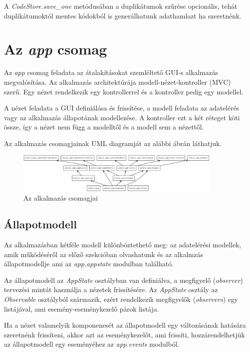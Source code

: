 A \emph{CodeStore.save\_one} metódusában a duplikátumok szűrése opcionális,
tehát duplikátumoktól mentes kódokból is generálhatunk adathamlazt ha szeretnénk.

\section{Az \emph{app} csomag}

Az \emph{app} csomag feladata az átalakításokat szemléltető GUI-s alkalmazás megvalósítása.
Az alkalmazás architektúrája modell-nézet-kontroller (MVC) szerű.
Egy nézet rendelkezik egy kontrollerrel és a kontroller pedig egy modellel.

A nézet feladata a GUI definiálása és frissítése,
a modell feladata az adatelérés vagy az alkalmazás állapotának modellezése.
A kontroller ezt a két réteget köti össze,
így a nézet nem függ a modelltől és a modell sem a nézettől.

Az alkalmazás csomagjainak UML diagramját az alábbi ábrán láthatjuk.

\begin{figure}[H]
	\centering
	\includegraphics[width=0.9\textwidth]{images/uml/apppackages.eps}
	\caption{Az alkalmazás csomagjai}
\end{figure}

\subsection{Állapotmodell}
\label{subsec:appstate}

Az alkalmazásban kétféle modell különböztethető meg:
az adatelérési modellek, amik működéséről az előző szekcióban olvashatunk
és az alkalmzás állapotmodellje ami az \emph{app.appstate} modulban található.

Az állapotmodell az \emph{AppState} osztályban van definiálva,
a megfigyelő (\emph{observer}) tervezési mintát használja a nézetek frissítésére.
Az \emph{AppState} osztály az \emph{Observable} osztályból származik,
ezért rendelkezik megfigyelők (\emph{observers}) egy listájával,
ami esemény-eseménykezelő párok listája.

Ha a nézet valamelyik komponenesét az állapotmodell egy változásának hatására szeretnénk frissíteni,
akkor azt az eseménykezelőt, ami frissíti,
hozzárendelhetjük az állapotmodell egy eseményéhez az \emph{app.events} modulból.

